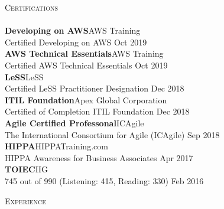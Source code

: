 \documentclass[a4paper]{article}
\newcommand{\lineunder} {
    \vspace*{-8pt} \\
    \hspace*{-18pt} \hrulefill \\
}
\newcommand{\header} [1] {
    {\hspace*{-18pt}\vspace*{6pt} \textsc{#1}}
    \vspace*{-6pt} \lineunder
}
\begin{document}
\header{Certifications}
\textbf{Developing on AWS}\hfill AWS Training\\
Certified Developing on AWS \hfill Oct 2019\\
\vspace{2mm}
\textbf{AWS Technical Essentials}\hfill AWS Training\\
Certified AWS Technical Essentials \hfill Oct 2019\\
\vspace{2mm}
\textbf{LeSS}\hfill LeSS\\
Certified LeSS Practitioner Designation \hfill Dec 2018\\
\vspace{2mm}
\textbf{ITIL Foundation}\hfill Apex Global Corporation\\
Certified of Completion ITIL Foundation \hfill Dec 2018\\
\vspace{2mm}
\textbf{Agile Certified Professonal}\hfill ICAgile\\
The International Consortium for Agile (ICAgile) \hfill Sep 2018\\
\vspace{2mm}
\textbf{HIPPA}\hfill HIPPATraining.com\\
HIPPA Awareness for Business Associates \hfill Apr 2017\\
\vspace{2mm}
\textbf{TOIEC}\hfill IIG\\
745 out of 990 (Listening: 415, Reading: 330) \hfill Feb 2016\\
\vspace{2mm}

\newpage

\header{Experience}
\vspace{1mm}
\end{document}
